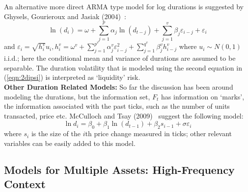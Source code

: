 An alternative more direct ARMA type model for log durations is suggested by Ghysels, Gourieroux and Jasiak (2004)~\cite{jasiak}:
\begin{equation}\label{eqn:21lnd}
	\ln{(d_i)} = \omega + \sum_{j=1}^p\alpha_j\ln{(d_{t-j})} + \sum_{j=1}^v\beta_j\varepsilon_{i-j} + \varepsilon_i
	\end{equation}
and $\varepsilon_i = \sqrt{h_i^v}u_i, h_i^v = \omega^v + \sum_{j=1}^{p^v}\alpha_j^v\varepsilon_{i-j}^2 + \sum_{j=1}^{q^v}\beta_j^vh_{i-j}^v$ where $u_i \sim N(0,1)$ i.i.d.; here the conditional mean and variance of durations are assumed to be separable. The duration volatility that is modeled using the second equation in (\ref{eqn:2dipsi}) is interpreted as `liquidity' risk. \\


\noindent \textbf{Other Duration Related Models:} So far the discussion has been around modeling the durations, but the information set, $F_t$ has information on `marks', the information associated with the past ticks, such as the number of units transacted, price etc. McCulloch and Tsay (2009)~\cite{} suggest the following model:
	\begin{equation}\label{eqn:2lndi}
	\ln{d_i} = \beta_0 + \beta_1\ln{(d_{t-1})} + \beta_2s_{i-1} + \sigma\varepsilon_i
	\end{equation}
where $s_i$ is the size of the $i$th price change measured in ticks; other relevant variables can be easily added to this model.


\subsection{Models for Multiple Assets: High-Frequency Context}


